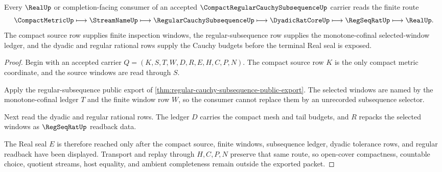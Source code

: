 \begin{theorem}
\label{thm:compact-regular-cauchy-subsequence-route}
Every $\RealUp$ or completion-facing consumer of an accepted $\CompactRegularCauchySubsequenceUp$ carrier reads the finite route
$$
\CompactMetricUp \longmapsto \StreamNameUp \longmapsto \RegularCauchySubsequenceUp \longmapsto \DyadicRatCoreUp \longmapsto \RegSeqRatUp \longmapsto \RealUp .
$$
The compact source row supplies finite inspection windows, the regular-subsequence row supplies the monotone-cofinal selected-window ledger, and the dyadic and regular rational rows supply the Cauchy budgets before the terminal Real seal is exposed.
\end{theorem}
\begin{proof}
Begin with an accepted carrier $Q=(K,S,T,W,D,R,E,H,C,P,N)$. The compact source row $K$ is the only compact metric coordinate, and the source windows are read through $S$.

Apply the regular-subsequence public export of \autoref{thm:regular-cauchy-subsequence-public-export}. The selected windows are named by the monotone-cofinal ledger $T$ and the finite window row $W$, so the consumer cannot replace them by an unrecorded subsequence selector.

Next read the dyadic and regular rational rows. The ledger $D$ carries the compact mesh and tail budgets, and $R$ repacks the selected windows as $\RegSeqRatUp$ readback data.

The Real seal $E$ is therefore reached only after the compact source, finite windows, subsequence ledger, dyadic tolerance rows, and regular readback have been displayed. Transport and replay through $H,C,P,N$ preserve that same route, so open-cover compactness, countable choice, quotient streams, host equality, and ambient completeness remain outside the exported packet.
\end{proof}


